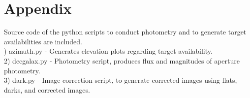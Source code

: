\documentclass[onecolumn]{aastex6}
\begin{document}
\clearpage
\section{Appendix}
Source code of the python scripts to conduct photometry and to generate target availabilities are included.
\\
) azimuth.py - Generates elevation plots regarding target availability.
\\
2) decgalax.py - Photometry script, produces flux and magnitudes of aperture photometry.
\\
3) dark.py - Image correction script, to generate corrected images using flats, darks, and corrected images.


%
%
%
%
%
%
%
%
%
%
%
%





\end{document}
